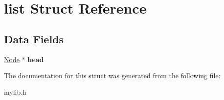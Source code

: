 \hypertarget{structlist}{}\section{list Struct Reference}
\label{structlist}
\subsection*{Data Fields}
\begin{DoxyCompactItemize}
\item 
\mbox{\label{structlist_aa3e81b47ac0637ebb1ea7cc12812405a}} 
\mbox{\hyperlink{structnode}{Node}} $\ast$ {\bfseries head}
\end{DoxyCompactItemize}


The documentation for this struct was generated from the following file\+:\begin{DoxyCompactItemize}
\item 
mylib.\+h\end{DoxyCompactItemize}
